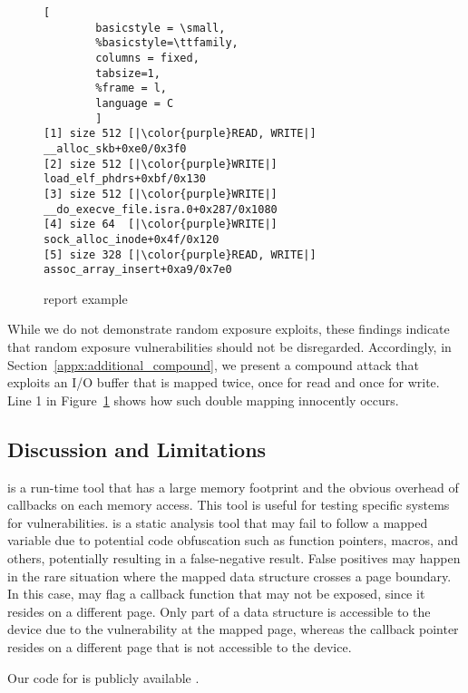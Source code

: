 %
\begin{figure}[t]
\begin{adjustbox}{width=0.9\linewidth}
        \begin{lstlisting}[
        basicstyle = \small,
        %basicstyle=\ttfamily,
        columns = fixed,
        tabsize=1,
        %frame = l,
        language = C
        ]
[1] size 512 [|\color{purple}READ, WRITE|] __alloc_skb+0xe0/0x3f0
[2] size 512 [|\color{purple}WRITE|] load_elf_phdrs+0xbf/0x130
[3] size 512 [|\color{purple}WRITE|] __do_execve_file.isra.0+0x287/0x1080
[4] size 64  [|\color{purple}WRITE|] sock_alloc_inode+0x4f/0x120
[5] size 328 [|\color{purple}READ, WRITE|] assoc_array_insert+0xa9/0x7e0
        \end{lstlisting}
\end{adjustbox}
        \caption{\dkasan report example}
        \label{fig:dkasan-report}
\end{figure}

While we do not demonstrate random exposure exploits, these findings indicate that random exposure vulnerabilities should not be disregarded. Accordingly, in Section~\ref{appx:additional_compound}, we present a compound attack that exploits an I/O buffer that is mapped twice, once for read and once for write. Line 1 in Figure~\ref{fig:dkasan-report}  shows how such double mapping innocently occurs.

\subsection{Discussion and Limitations}
\dkasan is a run-time tool that has a large memory footprint and the obvious overhead of callbacks on each memory access. This tool is useful for testing specific systems for vulnerabilities.
\tool is a static analysis tool that may fail to follow a mapped variable due to potential code obfuscation such as function pointers, macros, and others, potentially resulting in a false-negative result. False positives may happen in the rare situation 
where the mapped data structure crosses a  page boundary. In this case, \tool may flag a callback function that may not be exposed, since it resides on a different page. Only part of a data structure is accessible to the device due to the \subpage{} vulnerability at the mapped page, whereas the callback pointer resides on a different page that is not accessible to the device.%

Our code for \dkasan is publicly available \cite{DKASAN}.